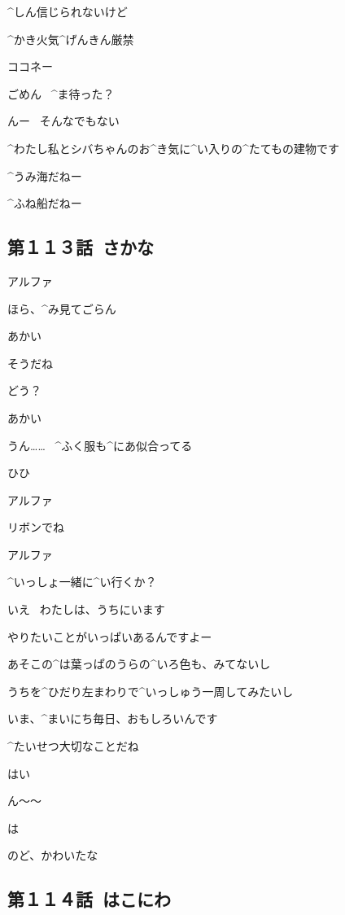 \Kokone ^{しん}{信}じられないけど

\page[26]
\Sign ^{かき}{火気}^{げんきん}{厳禁}

\Shiba ココネー

\page[27]
\Kokone ごめん
\ ^{ま}{待}った？

\Shiba んー
\ そんなでもない

\Kokone ^{わたし}{私}とシバちゃんのお^{き}{気}に^{い}{入}りの^{たてもの}{建物}です

\page[28]
\Shiba ^{うみ}{海}だねー

\Kokone ^{ふね}{船}だねー


\subsection{第１１３話\ さかな}

\page[32]
\Person アルファ

\page[33]
\Person ほら、^{み}{見}てごらん

\Alpha あかい

\Person そうだね

\page[35]
\Person どう？

\Alpha あかい

\Person うん……
\ ^{ふく}{服}も^{にあ}{似合}ってる

\Alpha ひひ

\page[37]
\Person アルファ

\Person リボンでね

\page[39]
\Person アルファ

\page[40]
\Person ^{いっしょ}{一緒}に^{い}{行}くか？

\Alpha いえ
\ わたしは、うちにいます

\page[41]
\Alpha やりたいことがいっぱいあるんですよー

\Alpha あそこの^{は}{葉}っぱのうらの^{いろ}{色}も、みてないし

\Alpha うちを^{ひだり}{左}まわりで^{いっしゅう}{一周}してみたいし

\Alpha いま、^{まいにち}{毎日}、おもしろいんです

\Person ^{たいせつ}{大切}なことだね

\Alpha はい

\page[43]
\Alpha ん〜〜

\Alpha は

\page[44]
\Alpha のど、かわいたな


\subsection{第１１４話\ はこにわ}

